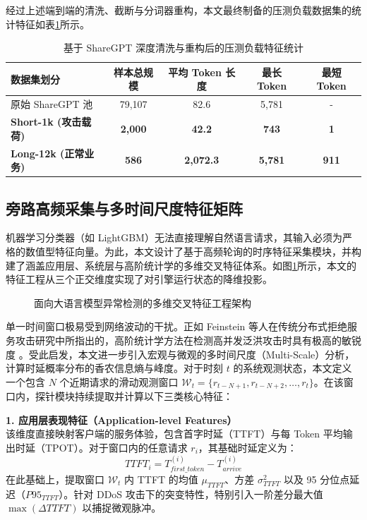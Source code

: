 \documentclass[master, vlined]{DissertUESTC}
\begin{document}
	经过上述端到端的清洗、截断与分词器重构，本文最终制备的压测负载数据集的统计特征如表\ref{tab: ShareGPT数据集特征}所示。

	\begin{table}[!ht]
		\centering
		\caption{基于 ShareGPT 深度清洗与重构后的压测负载特征统计} \label{tab: ShareGPT数据集特征}
		\begin{tabular}{l c c c c}
			\toprule
			\textbf{数据集划分} & \textbf{样本总规模} & \textbf{平均 Token 长度} & \textbf{最长 Token} & \textbf{最短 Token} \\
			\midrule
			原始 ShareGPT 池 & 79,107 & 82.6 & 5,781 & - \\
			\textbf{Short-1k (攻击载荷)} & \textbf{2,000} & \textbf{42.2} & \textbf{743} & \textbf{1} \\
			\textbf{Long-12k (正常业务)} & \textbf{586} & \textbf{2,072.3} & \textbf{5,781} & \textbf{911} \\
			\bottomrule
		\end{tabular}
	\end{table}

	\subsection{旁路高频采集与多时间尺度特征矩阵}
	机器学习分类器（如 LightGBM）无法直接理解自然语言请求，其输入必须为严格的数值型特征向量。为此，本文设计了基于高频轮询的时序特征采集模块，并构建了涵盖应用层、系统层与高阶统计学的多维交叉特征体系。如图\ref{fig: 特征工程分类架构}所示，本文的特征工程从三个正交维度实现了对引擎运行状态的降维投影。

	\begin{figure}[!htb]
		\centering
		\caption{面向大语言模型异常检测的多维交叉特征工程架构} \label{fig: 特征工程分类架构}
	\end{figure}
    

	单一时间窗口极易受到网络波动的干扰。正如 Feinstein 等人在传统分布式拒绝服务攻击研究中所指出的，高阶统计学方法在检测高并发泛洪攻击时具有极高的敏锐度 \cite{分布式拒绝服务攻击的统计学检测与响应方法}。受此启发，本文进一步引入宏观与微观的多时间尺度（Multi-Scale）分析，计算时延概率分布的香农信息熵与峰度。对于时刻 $t$ 的系统观测状态，本文定义一个包含 $N$ 个近期请求的滑动观测窗口 $\mathcal{W}_t = \{r_{t-N+1}, r_{t-N+2}, \dots, r_t\}$。在该窗口内，探针模块持续提取并计算以下三类核心特征：

	\textbf{1. 应用层表现特征（Application-level Features）} \\
	该维度直接映射客户端的服务体验，包含首字时延（TTFT）与每 Token 平均输出时延（TPOT）。对于窗口内的任意请求 $r_i$，其基础时延定义为：
	\begin{equation}
		TTFT_i = T_{first\_token}^{(i)} - T_{arrive}^{(i)}
	\end{equation}
	在此基础上，提取窗口 $\mathcal{W}_t$ 内 TTFT 的均值 $\mu_{TTFT}$、方差 $\sigma_{TTFT}^2$ 以及 95 分位点延迟（$P95_{TTFT}$）。针对 DDoS 攻击下的突变特性，特别引入一阶差分最大值 $\max(\Delta TTFT)$ 以捕捉微观脉冲。
\end{document}
